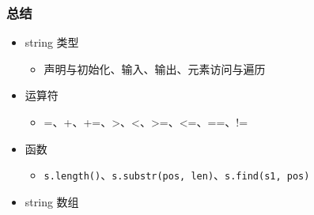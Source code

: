 \begin{frame}[fragile]
    \frametitle{总结}

    \begin{itemize}
        \item string 类型
        
        \begin{itemize}
            \item 声明与初始化、输入、输出、元素访问与遍历
        \end{itemize}

        \item 运算符
        
        \begin{itemize}
            \item =、+、+=、>、<、>=、<=、==、!=
        \end{itemize}

        \item 函数
        
        \begin{itemize}
            \item \lstinline|s.length()|、\lstinline|s.substr(pos, len)|、\lstinline|s.find(s1, pos)|
        \end{itemize}

        \item string 数组

    \end{itemize}
            
\end{frame}

